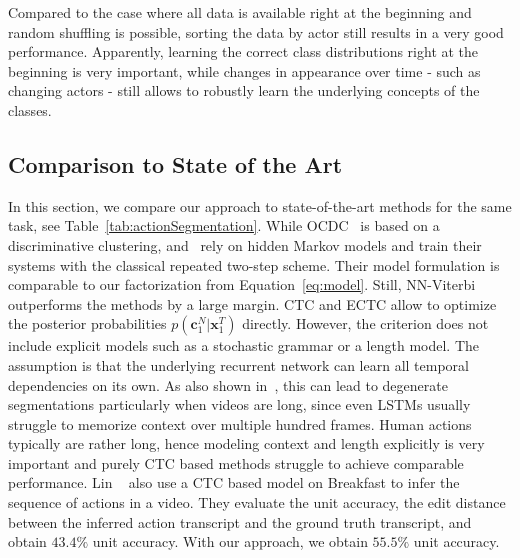 \documentclass[10pt,twocolumn,letterpaper]{article}
\begin{document}
Compared to the case where all data is available right at the beginning and random shuffling is
possible, sorting the data by actor still results in a very good performance. Apparently,
learning the correct class distributions right at the beginning is very important, while changes in appearance over time - such as changing actors - still allows to robustly learn the underlying concepts of the classes.


\subsection{Comparison to State of the Art}

In this section, we compare our approach to state-of-the-art methods for the same task,
see Table~\ref{tab:actionSegmentation}.
While OCDC~\cite{bojanowski14weakly} is based on a discriminative clustering,
\cite{kuehne16end} and~\cite{richard2017weakly} rely on hidden Markov models and train
their systems with the classical repeated two-step scheme. Their model formulation is
comparable to our factorization from Equation~\eqref{eq:model}. Still, NN-Viterbi outperforms
the methods by a large margin.
CTC and ECTC allow to optimize the posterior probabilities $ p(\mathbf{c}_1^N|\mathbf{x}_1^T) $ directly.
However, the criterion does not include explicit models such as a stochastic
grammar or a length model. The assumption is that the underlying recurrent network can learn
all temporal dependencies on its own. As also shown in~\cite{huang2016connectionist}, this can
lead to degenerate segmentations particularly when videos are long, since even LSTMs usually struggle
to memorize context over multiple hundred frames.
Human actions typically are rather long, hence modeling context and length explicitly is very
important and purely CTC based methods struggle to achieve comparable performance.
Lin \etal~\cite{lin2017ctc} also use a CTC based model on Breakfast to infer the sequence of actions in a video.
They evaluate the unit accuracy, \ie the edit distance between the inferred action transcript
and the ground truth transcript, and obtain $ 43.4\% $ unit accuracy. With our approach,
we obtain $ 55.5\% $ unit accuracy.
\end{document}
